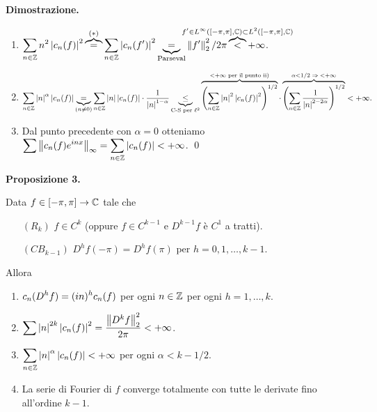 \newpage

\textbf{Dimostrazione.}
\begin{enumerate}

	\item $\ds \sum_{n \in \Z} n^2 \left| c_n(f) \right|^2 \overbrace{=}^{(\ast)} \sum_{n \in \Z} \left| c_n(f') \right|^2
	\underbrace{=}_{\text{Parseval}} \norm{f'}_2^2 / 2\pi \overbrace{<}^{\mathclap{f' \in L^\infty([-\pi,\pi], \C) \subset L^2([-\pi,\pi], \C) }} +\infty$.

	\item $\displaystyle \sum_{n \in \mathbb Z} \left| n \right|^\alpha \left| c_n(f) \right| 
	\underbrace{=}_{(n \neq 0)} \sum_{n \in \mathbb Z} \left| n \right| \left| c_n(f) \right| \cdot \frac{1}{\left| n \right|^{1-\alpha }}
	\underbrace{\leq}_{\text{C-S per } \ell^2} \overbrace{\left( \sum_{n \in \mathbb Z} \left| n \right|^2 \left| c_n(f) \right|^2  \right)^{1/2}}^{< +\infty \text{ per il punto ii)}} \cdot \overbrace{\left( \sum_{n \in \mathbb Z} \frac{1}{\left| n \right|^{2-2\alpha }}  \right)^{1/2}}^{\alpha < 1/2 \; \Rightarrow \; <+\infty} < +\infty. 
	$

	\item Dal punto precedente con $\alpha = 0$ otteniamo $\displaystyle \sum \left\lVert c_n(f) e^{inx} \right\rVert_\infty = \sum_{n \in \mathbb Z} \left| c_n(f) \right| < +\infty $.
\qed
\end{enumerate}

\hypertarget{prop:2021-08nov_prop_3}{%
\textbf{Proposizione 3.}} Data $f \in [-\pi,\pi] \to \mathbb C$ tale che
\begin{itemize}
	\item[$(R_k)$] $f \in C^k$ (oppure $f \in C^{k-1}$ e $D^{k-1}f$ è $C^1$ a tratti).

	\item[$(CB_{k-1})$] $D^h f(-\pi) = D^h f(\pi)$ per $h = 0,1,\ldots, k-1$.
\end{itemize}
Allora
\begin{enumerate}
	\item $\displaystyle c_n (D^h f) = (in)^h c_n(f)$ per ogni $n \in \mathbb Z$ per ogni $h = 1,\ldots,k$.

	\item $\displaystyle \sum \left| n \right|^{2k} \left| c_n(f) \right|^2 = \frac{\left\lVert D^k f \right\rVert_2^2}{2\pi} < +\infty$.

	\item $\displaystyle \sum_{n \in \mathbb Z} \left| n \right|^\alpha \left| c_n(f) \right| < +\infty $ per ogni $\alpha < k - 1/2$.

	\item La serie di Fourier di $f$ converge totalmente con tutte le derivate fino all'ordine $k-1$.
\end{enumerate}

